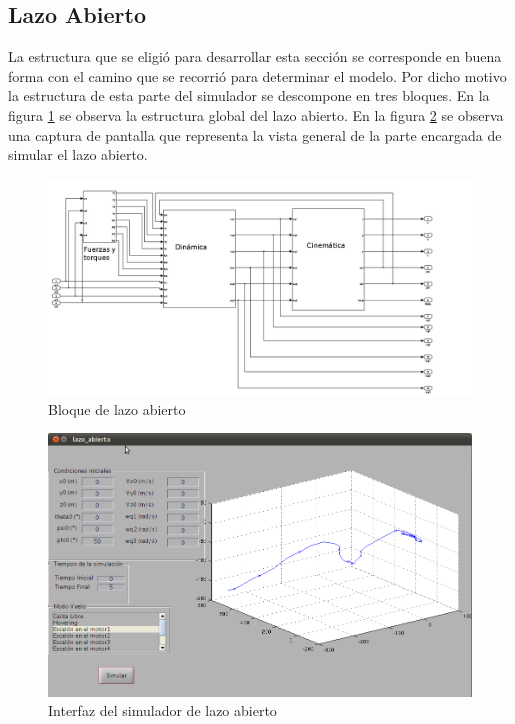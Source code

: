 \documentclass[main]{subfiles}
\begin{document}
\subsection{Lazo Abierto}

La estructura que se eligi\'o para desarrollar esta secci\'on se corresponde en buena forma con el camino que se recorri\'o para determinar el modelo. Por dicho motivo la estructura de esta parte del simulador se descompone en tres bloques. En la figura \ref{fig:lazo_abierto} se observa la estructura global del lazo abierto. En la figura \ref{fig:vista} se observa una captura de pantalla que representa la vista general de la parte encargada de simular el lazo abierto.
\begin{figure}[h!]
	\centering
	\includegraphics[width=1\textwidth]{./pics_simulador/lazo_abierto.png}
	\caption{Bloque de lazo abierto}
	\label{fig:lazo_abierto}
\end{figure}

\begin{figure}[h!]
	\centering
	\includegraphics[width=1\textwidth]{./pics_simulador/vista.png}
	\caption{Interfaz del simulador de lazo abierto}
	\label{fig:vista}
\end{figure}
\end{document}
